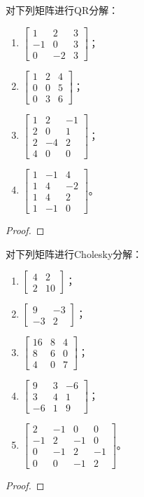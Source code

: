\begin{problem}
对下列矩阵进行QR分解：
\begin{enumerate}
    \item \(\begin{bmatrix}1&2&3\\-1&0&3\\0&-2&3\end{bmatrix}\)；
    \item \(\begin{bmatrix}1&2&4\\0&0&5\\0&3&6\end{bmatrix}\)；
    \item \(\begin{bmatrix}1&2&-1\\2&0&1\\2&-4&2\\4&0&0\end{bmatrix}\)；
    \item \(\begin{bmatrix}1&-1&4\\1&4&-2\\1&4&2\\1&-1&0\end{bmatrix}\)。
\end{enumerate}
\end{problem}
\begin{proof}
\end{proof}

\begin{problem}
对下列矩阵进行Cholesky分解：
\begin{enumerate}
    \item \(\begin{bmatrix}4&2\\2&10\end{bmatrix}\)；
    \item \(\begin{bmatrix}9&-3\\-3&2\end{bmatrix}\)；
    \item \(\begin{bmatrix}16&8&4\\8&6&0\\4&0&7\end{bmatrix}\)；
    \item \(\begin{bmatrix}9&3&-6\\3&4&1\\-6&1&9\end{bmatrix}\)；
    \item \(\begin{bmatrix}2&-1&0&0\\-1&2&-1&0\\0&-1&2&-1\\0&0&-1&2\end{bmatrix}\)。
\end{enumerate}
\end{problem}
\begin{proof}
\end{proof}

